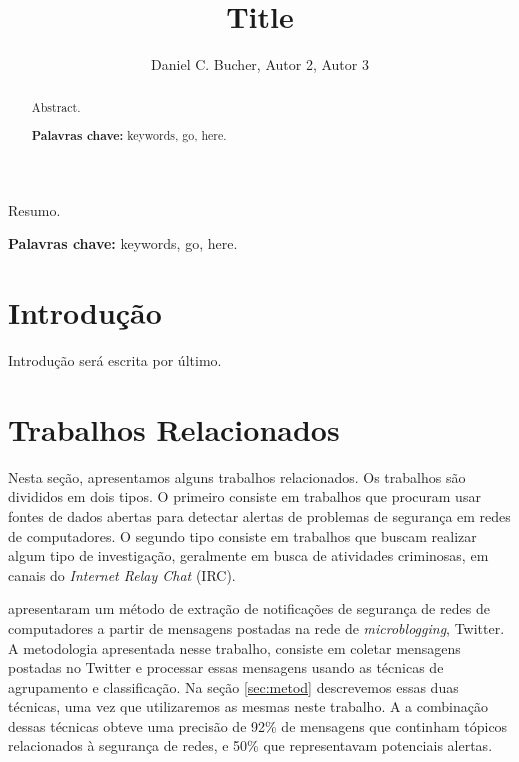 \documentclass[12pt]{article}
\title{Title}
\author {Daniel C. Bucher\inst{1}, Autor 2\inst{2}, Autor 3\inst{1} }
\begin{document}
\maketitle

\begin{resumo}
  Resumo.

\textbf{Palavras chave:} keywords, go, here.

\end{resumo}

\begin{abstract}
  Abstract.

\textbf{Palavras chave:} keywords, go, here.

\end{abstract}

\section{Introdução} \label{sec:intro}

Introdução será escrita por último.

\section{Trabalhos Relacionados} \label{sec:rel}

Nesta seção, apresentamos alguns trabalhos relacionados. Os trabalhos são
divididos em dois tipos. O primeiro consiste em trabalhos que procuram usar fontes de
dados abertas para detectar alertas de problemas de segurança em redes de
computadores. O segundo tipo consiste em trabalhos que buscam realizar algum
tipo de investigação, geralmente em busca de atividades criminosas, em canais do
\textit{Internet Relay Chat} (IRC).

\cite{santos2013} apresentaram um método de extração de notificações de
segurança de redes de computadores a partir de mensagens postadas na rede de
\textit{microblogging}, Twitter.
%
A metodologia apresentada nesse trabalho, consiste em coletar mensagens
postadas no Twitter e processar essas mensagens usando as técnicas de
agrupamento e classificação. Na seção \ref{sec:metod} descrevemos essas duas
técnicas, uma vez que utilizaremos as mesmas neste trabalho.
%
A a combinação dessas técnicas obteve uma precisão de 92\% de mensagens
que continham tópicos relacionados à segurança de redes, e 50\% que
representavam potenciais alertas.
\end{document}

